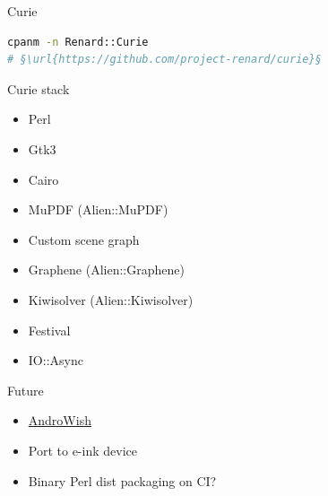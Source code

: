 \begin{frame}[fragile]{Curie}
\begin{center}
\end{center}
{
\begin{block}{}
\begin{lstlisting}[language=sh,xleftmargin=10pt,escapechar=§]
cpanm -n Renard::Curie
# §\url{https://github.com/project-renard/curie}§
\end{lstlisting}
\end{block}
}

\end{frame}

\begin{frame}{Curie stack}

	\begin{multicols}{2}
	\begin{itemize}[<+->]
		\item Perl
		\item Gtk3
		\item Cairo
		\item MuPDF (Alien::MuPDF)
		\item Custom scene graph
		\item Graphene (Alien::Graphene)
		\item Kiwisolver (Alien::Kiwisolver)
		\item Festival
		\item IO::Async
	\end{itemize}
	\end{multicols}
\end{frame}

\begin{frame}{Future}
	\begin{itemize}[<+->]
		\item \href{http://androwish.org/home/home}{AndroWish}
		\item Port to e-ink device
		\item Binary Perl dist packaging on CI?
	\end{itemize}
\end{frame}


